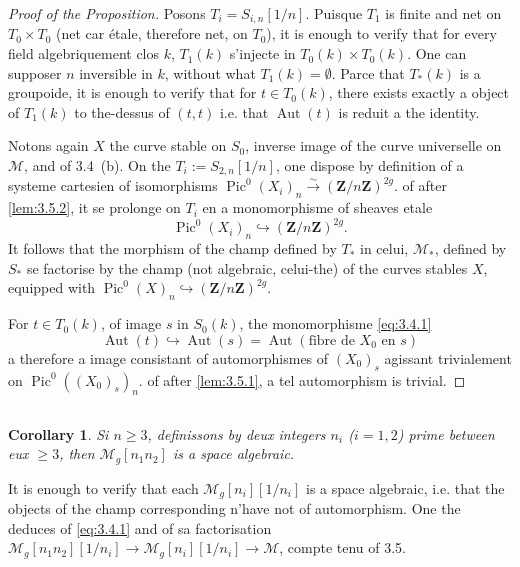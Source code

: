 \documentclass[12pt,a4paper]{article}
\theoremstyle{plain}
\newtheorem{corollary}[theorem]{Corollary}
\theoremstyle{definition}
\theoremstyle{remark}
\DeclareMathOperator{\Pic}{Pic}
\DeclareMathOperator{\Aut}{Aut}
\begin{document}
\begin{proof}[Proof of the Proposition]
Posons $T_i = S_{i,n}[1/n]$. Puisque $T_1$ is finite and net on $T_0 \times T_0$ (net car étale, therefore net, on $T_0$), it is enough to verify that for every field algebriquement clos $k$, $T_1(k)$ s'injecte in $T_0(k) \times T_0(k)$. One can supposer $n$ inversible in $k$, without what $T_1(k) = \emptyset$. Parce that $T_*(k)$ is a groupoide, it is enough to verify that for $t \in T_0(k)$, there exists exactly a object of $T_1(k)$ to the-dessus of $(t,t)$ i.e. that $\Aut(t)$ is reduit a the identity.

Notons again $X$ the curve stable on $S_0$, inverse image of the curve universelle on $\mathcal{M}$, and of 3.4~(b). On the $T_i := S_{2,n}[1/n]$, one dispose by definition of a systeme cartesien of isomorphisms $\Pic^0(X_i)_n \xrightarrow{\sim} (\mathbf{Z}/n\mathbf{Z})^{2g}$. of after \ref{lem:3.5.2}, it se prolonge on $T_i$ en a monomorphisme of sheaves etale
\[
\Pic^0(X_i)_n \hookrightarrow (\mathbf{Z}/n\mathbf{Z})^{2g}.
\]
It follows that the morphism of the champ defined by $T_*$ in celui, $\mathcal{M}_*$, defined by $S_*$ se factorise by the champ (not algebraic, celui-the) of the curves stables $X$, equipped with $\Pic^0(X)_n \hookrightarrow (\mathbf{Z}/n\mathbf{Z})^{2g}$.

For $t \in T_0(k)$, of image $s$ in $S_0(k)$, the monomorphisme \eqref{eq:3.4.1}
\[
\Aut(t) \hookrightarrow \Aut(s) = \Aut(\text{fibre de } X_0 \text{ en } s)
\]
a therefore a image consistant of automorphismes of $(X_0)_s$ agissant trivialement on $\Pic^0((X_0)_s)_n$. of after \ref{lem:3.5.1}, a tel automorphism is trivial.
\end{proof}

\subsection{}

\begin{corollary}
Si $n \geq 3$, definissons by deux integers $n_i$ ($i = 1,2$) prime between eux $\geq 3$, then $\mathcal{M}_g[n_1 n_2]$ is a space algebraic.
\end{corollary}

It is enough to verify that each $\mathcal{M}_g[n_i][1/n_i]$ is a space algebraic, i.e. that the objects of the champ corresponding n'have not of automorphism. One the deduces of \eqref{eq:3.4.1} and of sa factorisation $\mathcal{M}_g[n_1 n_2][1/n_i] \to \mathcal{M}_g[n_i][1/n_i] \to \mathcal{M}$, compte tenu of 3.5.
\end{document}
